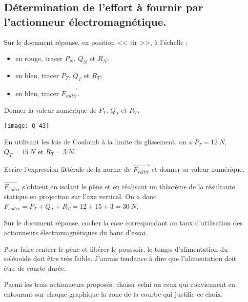 \documentclass[11pt]{article}
\begin{document}
\subsection*{Détermination de l'effort à fournir par l'actionneur électromagnétique.}
\UPSTIquestion* Sur le document réponse, en position << tir >>, à l'échelle : 
\begin{itemize}
\item en rouge, tracer $P_N$, $Q_N$ et $R_N$;
\item en bleu, tracer $P_T$, $Q_T$ et $R_T$;
\item en bleu, tracer $\overrightarrow{F_{sol tir}}$.
\end{itemize}
Donner la valeur numérique de $P_T$, $Q_T$ et $R_T$.

\begin{UPSTIcorrige}
\begin{center}
\texttt{[image: Q\_43]}
\end{center}

En utilisant les lois de Coulomb à la limite du glissement, on a $P_T=\SI{12}{N}$, $Q_T=\SI{15}{N}$ et $R_T=\SI{3}{N}$.
\end{UPSTIcorrige}

\UPSTIquestion Ecrire l'expression littérale de la norme de $\overrightarrow{F_{sol tir}}$ et donner sa valeur numérique.
\begin{UPSTIcorrige}

$\overrightarrow{F_{sol tir}}$ s'obtient en isolant le pêne et en réalisant un thèorème de la résultante statique en projection  sur l'axe vertical. On a donc $F_{sol tir} = P_T + Q_T + R_T = 12+15+3 = \SI{30}{N}$.

\end{UPSTIcorrige}

\UPSTIquestion Sur le document réponse, cocher la case correspondant au taux d'utilisation des actionneurs électromagnétiques du banc d'essai.

\begin{UPSTIcorrige}
Pour faire rentrer le pène et libérer le poussoir, le temps d'alimentation du solénoïde doit être très faible. J'aurais tendance à dire que l'alimentation doit être de courte durée. 
\end{UPSTIcorrige}

\UPSTIquestion Parmi les trois actionneurs proposés, choisir celui ou ceux qui conviennent en entourant sur chaque graphique la zone de la courbe qui justifie ce choix.
\end{document}
